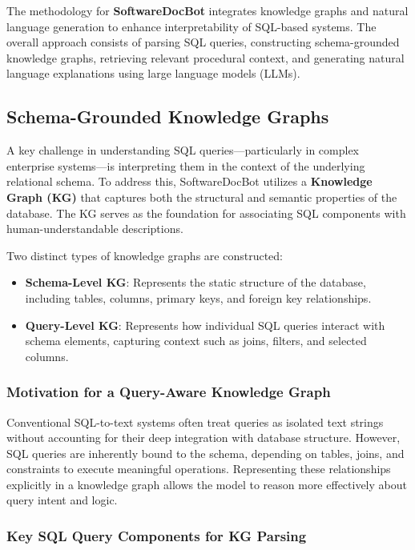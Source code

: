 \documentclass[11pt]{article}
\begin{document}
The methodology for \textbf{SoftwareDocBot} integrates knowledge graphs and natural language generation to enhance interpretability of SQL-based systems. The overall approach consists of parsing SQL queries, constructing schema-grounded knowledge graphs, retrieving relevant procedural context, and generating natural language explanations using large language models (LLMs).

\subsection{Schema-Grounded Knowledge Graphs}

A key challenge in understanding SQL queries—particularly in complex enterprise systems—is interpreting them in the context of the underlying relational schema. To address this, SoftwareDocBot utilizes a \textbf{Knowledge Graph (KG)} that captures both the structural and semantic properties of the database. The KG serves as the foundation for associating SQL components with human-understandable descriptions.

Two distinct types of knowledge graphs are constructed:

\begin{itemize}
    \item \textbf{Schema-Level KG}: Represents the static structure of the database, including tables, columns, primary keys, and foreign key relationships.
    \item \textbf{Query-Level KG}: Represents how individual SQL queries interact with schema elements, capturing context such as joins, filters, and selected columns.
\end{itemize}

\subsubsection{Motivation for a Query-Aware Knowledge Graph}

Conventional SQL-to-text systems often treat queries as isolated text strings without accounting for their deep integration with database structure. However, SQL queries are inherently bound to the schema, depending on tables, joins, and constraints to execute meaningful operations. Representing these relationships explicitly in a knowledge graph allows the model to reason more effectively about query intent and logic.


\subsubsection{Key SQL Query Components for KG Parsing}
\end{document}
